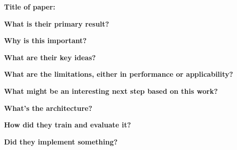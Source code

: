 \noindent \textbf{\large Title of paper: }

\noindent\textbf{\large What is their primary result?}

\noindent\textbf{\large Why is this important?}

\noindent\textbf{\large What are their key ideas?}

\noindent\textbf{\large What are the limitations, either in performance or applicability?}

\noindent\textbf{\large What might be an interesting next step based on this work?}

\noindent\textbf{\large What's the architecture?}

\noindent\textbf{\large How did they train and evaluate it?}

\noindent\textbf{\large Did they implement something?}


